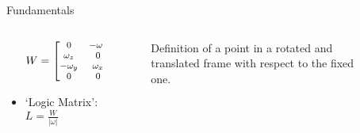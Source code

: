 \begin{frame}{Fundamentals}
\begin{columns}
\begin{column}{0.5\textwidth}
\begin{itemize}
\begin{equation}
                    \begin{footnotesize}
                    W=\begin{bmatrix}
                      0&-\omega_z&\omega_y&v_x\\
                      \omega_z&0&-\omega_x&v_y\\
                      -\omega_y&\omega_x&0&v_z\\
                      0&0&0&0
                    \end{bmatrix}
                    \end{footnotesize}
                  \end{equation}
                \item `Logic Matrix': $ L=\frac{W}{|\omega|}$
            \end{itemize}
        \end{column}
        \begin{column}{0.5\textwidth}
            \begin{figure}
                \centering
                \scalebox{0.6}{}
                \caption{Definition of a point in a rotated and translated frame with respect to the fixed one.}
              \end{figure}
        \end{column}
    \end{columns}
\end{frame}

